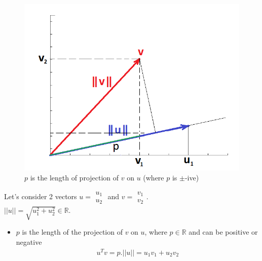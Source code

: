 \documentclass[a4paper,12pt]{report}
\begin{document}
\begin{appendices}
\begin{figure}[H]
	\centering
        \includegraphics[totalheight=4 cm]{vectors.png}\caption{$p$ is the length of projection of $v$ on $u$ (where $p$ is $\pm$-ive)} 
\end{figure}
Let's consider 2 vectors $u=\begin{smallmatrix} u_1 \\ u_2 \end{smallmatrix}$ and $v=\begin{smallmatrix} v_1 \\ v_2 \end{smallmatrix}$. \\
$||u|| = \sqrt{u_1 ^2 + u_2 ^2} \in \mathbb{R}$.

\begin{itemize}
\item $p$ is the length of the projection of $v$ on $u$, where $p \in \mathbb{R}$ and can be positive or negative \\
\begin{align}
u^T v = p . ||u|| = u_1 v_1 + u_2 v_2
\end{align}
\end{itemize}


\end{appendices}
\end{document}
